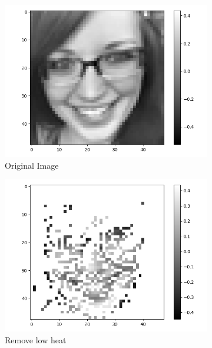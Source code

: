 \documentclass[fleqn,a4paper,12pt]{article}
\begin{document}
\begin{figure}[h]
\centering
\begin{subfigure}{.33\textwidth}
  \centering
  \includegraphics[width=\linewidth]{report-imgs/sa-orig.png}
  \caption{Original Image}
  \label{fig:sub1}
\end{subfigure}%
\begin{subfigure}{.33\textwidth}
  \centering
  \includegraphics[width=\linewidth]{report-imgs/sa-rm-low-heat.png}
  \caption{Remove low heat}
  \label{fig:sub2}
\end{subfigure}
\begin{subfigure}{.33\textwidth}
  \centering  

\end{subfigure}
\end{figure}
\end{document}
